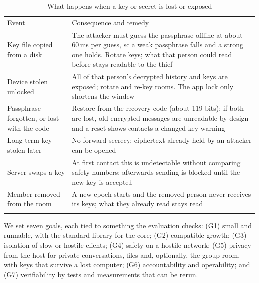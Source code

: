 \documentclass[graybox]{svmult}
\begin{document}
\begin{table}[!tb]
\caption{What happens when a key or secret is lost or exposed}
\label{tab:compromise}
\footnotesize
\setlength{\tabcolsep}{3pt}
\begin{tabular}{p{3.0cm}p{8.4cm}}
\svhline\noalign{\smallskip}
Event & Consequence and remedy \\
\noalign{\smallskip}\svhline\noalign{\smallskip}
Key file copied from a disk & The attacker must guess the passphrase offline at about 60\,ms per guess, so a weak passphrase falls and a strong one holds. Rotate keys; what that person could read before stays readable to the thief \\
Device stolen unlocked & All of that person's decrypted history and keys are exposed; rotate and re-key rooms. The app lock only shortens the window \\
Passphrase forgotten, or lost with the code & Restore from the recovery code (about 119 bits); if both are lost, old encrypted messages are unreadable by design and a reset shows contacts a changed-key warning \\
Long-term key stolen later & No forward secrecy: ciphertext already held by an attacker can be opened \\
Server swaps a key & At first contact this is undetectable without comparing safety numbers; afterwards sending is blocked until the new key is accepted \\
Member removed from the room & A new epoch starts and the removed person never receives its keys; what they already read stays read \\
\noalign{\smallskip}\svhline\noalign{\smallskip}
\end{tabular}
\end{table}
We set seven goals, each tied to something the evaluation checks: (G1) small and runnable, with the standard library for the core; (G2) compatible growth; (G3) isolation of slow or hostile clients; (G4) safety on a hostile network; (G5) privacy from the host for private conversations, files and, optionally, the group room, with keys that survive a lost computer; (G6) accountability and operability; and (G7) verifiability by tests and measurements that can be rerun.
\end{document}
